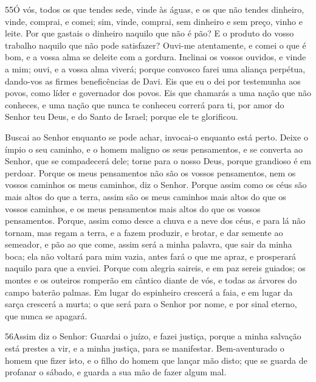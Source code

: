 \medskip

\lettrine{55}{}Ó vós, todos os que tendes sede, vinde às águas,
e os que não tendes dinheiro, vinde, comprai, e comei; sim, vinde,
comprai, sem dinheiro e sem preço, vinho e leite. Por que
gastais o dinheiro naquilo que não é pão? E o produto do vosso
trabalho naquilo que não pode satisfazer? Ouvi-me atentamente, e
comei o que é bom, e a vossa alma se deleite com a gordura.
Inclinai os vossos ouvidos, e vinde a mim; ouvi, e a vossa alma
viverá; porque convosco farei uma aliança perpétua, dando-vos as
firmes beneficências de Davi. Eis que eu o dei por testemunha
aos povos, como líder e governador dos povos. Eis que chamarás a
uma nação que não conheces, e uma nação que nunca te conheceu
correrá para ti, por amor do Senhor teu Deus, e do Santo de Israel;
porque ele te glorificou.

Buscai ao Senhor enquanto se pode achar, invocai-o enquanto está
perto. Deixe o ímpio o seu caminho, e o homem maligno os seus
pensamentos, e se converta ao Senhor, que se compadecerá dele; torne
para o nosso Deus, porque grandioso é em perdoar. Porque os meus
pensamentos não são os vossos pensamentos, nem os vossos caminhos os
meus caminhos, diz o Senhor. Porque assim como os céus são mais
altos do que a terra, assim são os meus caminhos mais altos do que
os vossos caminhos, e os meus pensamentos mais altos do que os
vossos pensamentos. Porque, assim como desce a chuva e a neve
dos céus, e para lá não tornam, mas regam a terra, e a fazem
produzir, e brotar, e dar semente ao semeador, e pão ao que come,
assim será a minha palavra, que sair da minha boca; ela não
voltará para mim vazia, antes fará o que me apraz, e prosperará
naquilo para que a enviei. Porque com alegria saireis, e em
paz sereis guiados; os montes e os outeiros romperão em cântico
diante de vós, e todas as árvores do campo baterão palmas. Em
lugar do espinheiro crescerá a faia, e em lugar da sarça crescerá a
murta; o que será para o Senhor por nome, e por sinal eterno, que
nunca se apagará.

\medskip

\lettrine{56}{}Assim diz o Senhor: Guardai o juízo, e fazei
justiça, porque a minha salvação está prestes a vir, e a minha
justiça, para se manifestar. Bem-aventurado o homem que fizer
isto, e o filho do homem que lançar mão disto; que se guarda de
profanar o sábado, e guarda a sua mão de fazer algum mal.

